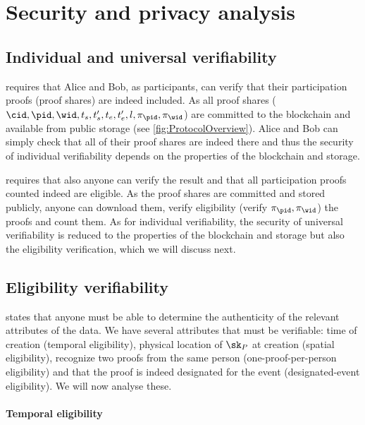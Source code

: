\section{Security and privacy analysis}%
\label{SecurityAnalysis}

\subsection{Individual and universal verifiability}%
\label{analysis-individual}%
\label{analysis-universal}

 requires that Alice and Bob, as participants, can verify 
that their participation proofs (proof shares) are indeed included.
As all proof shares (\ie \(\cid, \pid, \wid, t_s, t_s', t_e, t_e', l, \pi_\pid, 
  \pi_{\wid}\)) are committed to the blockchain and available from public 
storage (see \cref{fig:ProtocolOverview}).
Alice and Bob can simply check that all of their proof shares are indeed there 
and thus the security of individual verifiability depends on the properties of 
the blockchain and storage.

 requires that also anyone can verify the result and that 
all participation proofs counted indeed are eligible.
As the proof shares are committed and stored publicly, anyone can download 
them, verify eligibility (\ie verify \(\pi_\pid, \pi_{\wid}\)) the proofs and 
count them.
As for individual verifiability, the security of universal verifiability is 
reduced to the properties of the blockchain and storage but also the eligibility 
verification, which we will discuss next.

\subsection{Eligibility verifiability}%
\label{analysis-eligibility}

 states that anyone must be able to determine the 
authenticity of the relevant attributes of the data.
We have several attributes that must be verifiable:
time of creation (temporal eligibility),
physical location of \(\sk_P\) at creation (spatial eligibility),
recognize two proofs from the same person (one-proof-per-person eligibility) and 
that the proof is indeed designated for the event (designated-event 
eligibility).
We will now analyse these.

\paragraph{Temporal eligibility}%
\label{analysis-temporal}

